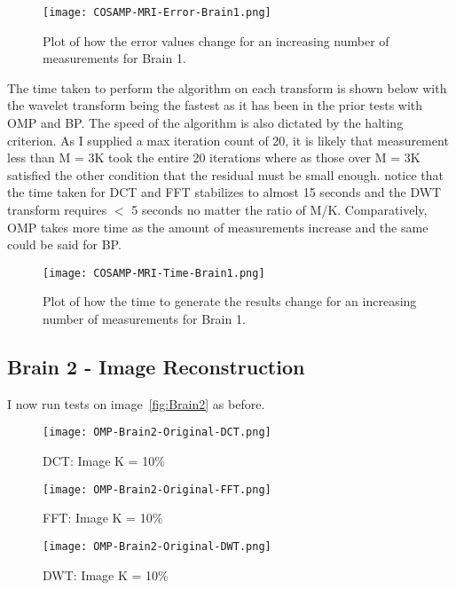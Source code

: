 \documentclass[titlepage,oneside, 12pt]{book}
\theoremstyle{break}
\begin{document}
\begin{figure}[H]
\centering
\centerline{\texttt{[image: COSAMP-MRI-Error-Brain1.png]}}
\caption{Plot of how the error values change for an increasing number of measurements for Brain 1.}
\label{fig:COSAMP-MRI-Error-Brain1}
\end{figure}
 
The time taken to perform the algorithm on each transform is shown below with the wavelet transform being the fastest as it has been in the prior tests with OMP and BP. 
The speed of the algorithm is also dictated by the halting criterion. As I supplied a max iteration count of 20, it is likely that measurement less than M = 3K took the entire 20 iterations where as those over M = 3K satisfied the other condition that the residual must be small enough. notice that the time taken for DCT and FFT stabilizes to  almost 15 seconds and the DWT transform requires $<$ 5 seconds no matter the ratio of M/K. Comparatively, OMP takes more time as the amount of measurements increase and the same could be said for BP. 
\clearpage
\begin{figure}[H]
\centering
\centerline{\texttt{[image: COSAMP-MRI-Time-Brain1.png]}}
\caption{Plot of how the time to generate the results change for an increasing number of measurements for Brain 1.}
\label{fig:COSAMP-MRI-Time-Brain1}
\end{figure}




\clearpage


\subsection{Brain 2 - Image Reconstruction}

I now run tests on image~\ref{fig:Brain2} as before.

\begin{figure}[!h]
\centering
{}
  \texttt{[image: OMP-Brain2-Original-DCT.png]}
  \caption{DCT: Image K = 10\%}\label{fig:COSAMP-Brain2-Original-DCT}
\endminipage
\hspace*{2em}
  \texttt{[image: OMP-Brain2-Original-FFT.png]}
  \caption{FFT: Image K = 10\%}\label{fig:COSAMP-Brain2-Original-FFT}
\endminipage
\hspace*{2em}
%
  \texttt{[image: OMP-Brain2-Original-DWT.png]}
  \caption{DWT: Image K = 10\%}\label{fig:COSAMP-Brain2-Original-DWT}
\endminipage
\hspace*{2em}
\end{figure}
\end{document}
